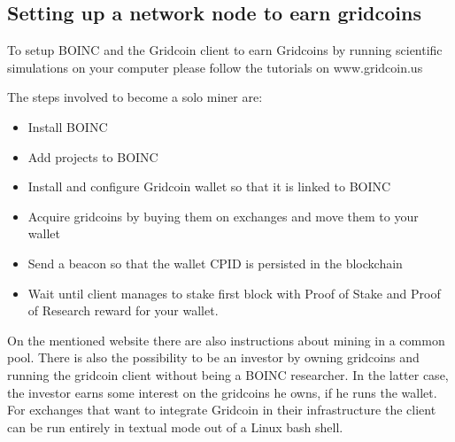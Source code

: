 \subsection{Setting up a network node to earn gridcoins}

To setup BOINC and the Gridcoin client to earn Gridcoins by running scientific simulations on your computer please follow the tutorials on www.gridcoin.us

The steps involved to become a solo miner are:
\begin{itemize}
  \item Install BOINC
  \item Add projects to BOINC
  \item Install and configure Gridcoin wallet so that it is linked to BOINC 
  \item Acquire gridcoins by buying them on exchanges and move them to your wallet
  \item Send a beacon so that the wallet CPID is persisted in the blockchain
  \item Wait until client manages to stake first block with Proof of Stake and Proof of Research reward for your wallet.
\end{itemize}

On the mentioned website there are also instructions about mining in a common pool. There is also the possibility to be an investor by owning gridcoins and running the gridcoin client without being a BOINC researcher. In the latter case, the investor earns some interest on the gridcoins he owns, if he runs the wallet.\\

For exchanges that want to integrate Gridcoin in their infrastructure the client can be run entirely in textual mode out of a Linux bash shell.\\
